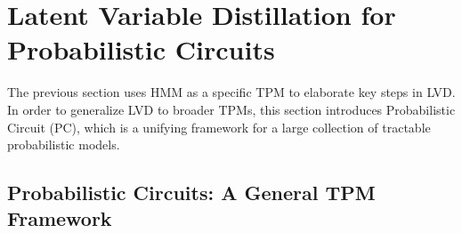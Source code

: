 \documentclass{article} %
\newcommand{\guy}[1]{\textcolor{blue}{\textbf{[Guy: #1]}}}
\newcommand{\anji}[1]{\textcolor{purple}{\textbf{[Anji: #1]}}}
\begin{document}






\section{Latent Variable Distillation for Probabilistic Circuits}
\label{sec:background}

The previous section uses HMM as a specific TPM to elaborate key steps in LVD. In order to generalize LVD to broader TPMs, this section introduces Probabilistic Circuit (PC), which is a unifying framework for a large collection of tractable probabilistic models.

\subsection{Probabilistic Circuits: A General TPM Framework}
\label{sec:pc}
\end{document}
